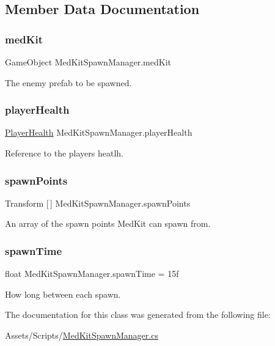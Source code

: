 \subsection{Member Data Documentation}
\mbox{\label{class_med_kit_spawn_manager_a7d21e6e883f70f8235494041e37c0e91}} 
\subsubsection{\texorpdfstring{medKit}{medKit}}
{\footnotesize\ttfamily Game\+Object Med\+Kit\+Spawn\+Manager.\+med\+Kit}

The enemy prefab to be spawned. \mbox{\label{class_med_kit_spawn_manager_af9b64da2dcd836723791148aa78cb6ba}} 
\subsubsection{\texorpdfstring{playerHealth}{playerHealth}}
{\footnotesize\ttfamily \mbox{\hyperlink{class_player_health}{Player\+Health}} Med\+Kit\+Spawn\+Manager.\+player\+Health}

Reference to the player\textquotesingle{}s heatlh. \mbox{\label{class_med_kit_spawn_manager_a08e4d7cce7756ec457daa6bf4bddaa94}} 
\subsubsection{\texorpdfstring{spawnPoints}{spawnPoints}}
{\footnotesize\ttfamily Transform \mbox{[}$\,$\mbox{]} Med\+Kit\+Spawn\+Manager.\+spawn\+Points}

An array of the spawn points Med\+Kit can spawn from. \mbox{\label{class_med_kit_spawn_manager_ad4d2f8bf1b851fd3c2049ad92d432fd5}} 
\subsubsection{\texorpdfstring{spawnTime}{spawnTime}}
{\footnotesize\ttfamily float Med\+Kit\+Spawn\+Manager.\+spawn\+Time = 15f}

How long between each spawn. 

The documentation for this class was generated from the following file\+:\begin{DoxyCompactItemize}
\item 
Assets/\+Scripts/\mbox{\hyperlink{_med_kit_spawn_manager_8cs}{Med\+Kit\+Spawn\+Manager.\+cs}}\end{DoxyCompactItemize}
